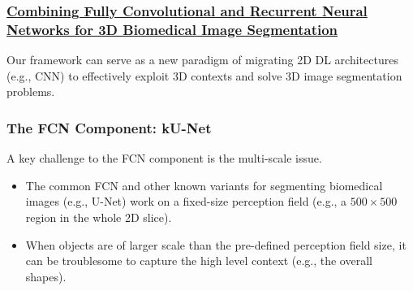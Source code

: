\documentclass{beamer}
\begin{document}

\begin{frame}
  \frametitle{\href{https://arxiv.org/pdf/1609.01006v2.pdf}
    {Combining Fully Convolutional and Recurrent Neural Networks for 3D Biomedical Image Segmentation}}

  Our framework can serve as a new paradigm of
  migrating 2D DL architectures (e.g., CNN) to effectively exploit 3D contexts and solve 3D image segmentation problems.
\end{frame}


\begin{frame}
  \frametitle{The FCN Component: kU-Net}
  A key challenge to the FCN component is the multi-scale issue. 
  \begin{itemize}
  \item The common FCN and other known variants for segmenting biomedical images (e.g., U-Net) work on a
    fixed-size perception field (e.g., a $500\times500$ region in the whole 2D slice). 
  \item When objects are of larger
    scale than the pre-defined perception field size, it can be troublesome  to capture
    the high level context (e.g., the overall shapes). 
  \end{itemize}
\end{frame}
\end{document}
